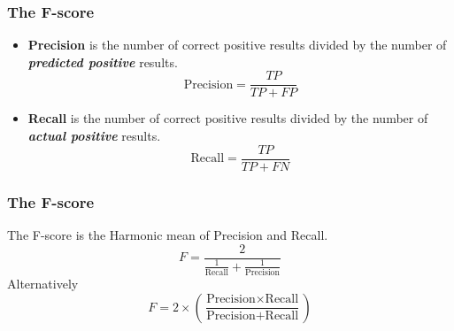 \documentclass[a4]{beamer}
\begin{document}
\begin{frame}
	\frametitle{The F-score}
	\Large
	\begin{itemize}
		\item \textbf{Precision} is the number of correct positive results divided by the number of \textit{\textbf{predicted positive}} results.
		\[ \mbox{Precision}= \frac{TP}{TP+FP}  \]
		\item \textbf{Recall} is the number of correct positive results divided by the number of \textit{\textbf{actual positive}} results. 
		\[ \mbox{Recall}= \frac{TP}{TP+FN}  \]
	\end{itemize}
\end{frame}
\begin{frame}
	\frametitle{The F-score}
	\Large The F-score is the Harmonic mean of Precision and Recall.
	\[ F = \frac{2}{\frac{1}{\mbox{Recall}} + \frac{1}{\mbox{Precision}}} \]
	Alternatively
	\[ F = 2 \times \left( \frac{\mbox{Precision} \times \mbox{Recall}}{\mbox{Precision} + \mbox{Recall}} \right) \] 
\end{frame}
\end{document}

